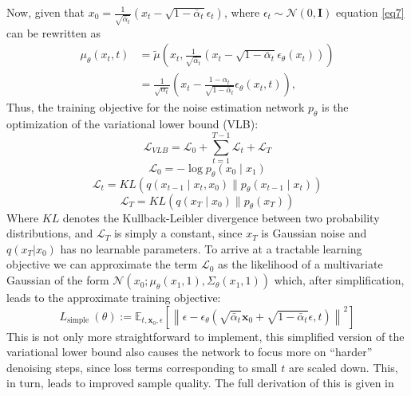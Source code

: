 \documentclass{article}
\begin{document}
Now, given that $x_0=\frac{1}{\sqrt{\bar{\alpha}_t}}\left(x_t-\sqrt{1-\bar{\alpha}_t} \epsilon_t\right)$, where $\epsilon_t \sim \mathcal{N}(0, \mathbf{I})$ equation \ref{eq7} can be rewritten as 
\begin{equation}
    \begin{aligned}
\mu_\theta\left(x_t, t\right) & =\tilde{\mu}\left(x_t, \frac{1}{\sqrt{\bar{\alpha}_t}}\left(x_t-\sqrt{1-\bar{\alpha}_t} \epsilon_\theta\left(x_t\right)\right)\right) \\
& =\frac{1}{\sqrt{\alpha_t}}\left(x_t-\frac{1-\alpha_t}{\sqrt{1-\bar{\alpha}_t}} \epsilon_\theta\left(x_t, t\right)\right),
\end{aligned}
\end{equation}
Thus, the training objective for the noise estimation network $p_\theta$ is the optimization of the variational lower bound (VLB):
\begin{equation}
    \mathcal{L}_{V L B}=\mathcal{L}_0+\sum_{t=1}^{T-1} \mathcal{L}_t+\mathcal{L}_T
\end{equation}
\begin{equation}
    \mathcal{L}_0=-\log p_\theta\left(x_0 \mid x_1\right)
\end{equation}
\begin{equation}
    \mathcal{L}_t=K L\left(q\left(x_{t-1} \mid x_t, x_0\right) \| p_\theta\left(x_{t-1} \mid x_t\right)\right)
\end{equation}
\begin{equation}
    \mathcal{L}_T=K L\left(q\left(x_T \mid x_0\right) \| p_\theta\left(x_T\right)\right)
\end{equation}
Where $KL$ denotes the Kullback-Leibler divergence between two probability distributions, and $\mathcal{L}_T$ is simply a constant, since $x_T$ is Gaussian noise and $q(x_T|x_0)$ has no learnable parameters. To arrive at a tractable learning objective we can approximate the term $\mathcal{L_0}$ as the likelihood of a multivariate Gaussian of the form $\mathcal{N}\left(x_0 ; \mu_\theta\left(x_1, 1\right), \Sigma_\theta\left(x_1, 1\right)\right)$ which, after simplification, leads to the approximate training objective: 
\begin{equation}
    L_{\text {simple }}(\theta):=\mathbb{E}_{t, \mathbf{x}_0, \epsilon}\left[\left\|\epsilon-\epsilon_\theta\left(\sqrt{\bar{\alpha}_t} \mathbf{x}_0+\sqrt{1-\bar{\alpha}_t} \epsilon, t\right)\right\|^2\right]
\end{equation}
This is not only more straightforward to implement, this simplified version of the variational lower bound also causes the network to focus more on ``harder'' denoising steps, since loss terms corresponding to small $t$ are scaled down. This, in turn, leads to improved sample quality. The full derivation of this is given in \cite{ho2020denoising}
\end{document}
